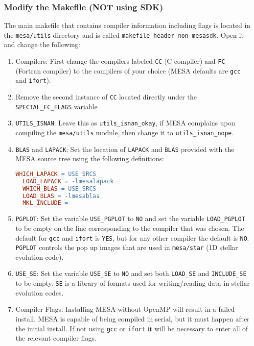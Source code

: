 \subsubsection{Modify the Makefile (NOT using SDK)}
The main makefile that contains compiler information including flags is 
located in the {\tt mesa/utils} directory and is called 
{\tt makefile\_header\_non\_mesasdk}. Open it and change the following:
\begin{enumerate}
\item Compilers: First change the compilers labeled {\tt CC} (C compiler) 
and {\tt FC} (Fortran compiler) to the compilers of your choice ({\sf MESA} 
defaults are {\tt gcc} and {\tt ifort}).

\item Remove the second instance of {\tt CC} located directly under the 
{\tt SPECIAL\_FC\_FLAGS} variable

\item {\tt UTILS\_ISNAN}: Leave this as {\tt utils\_isnan\_okay}, if {\sf MESA} 
complains upon compiling the {\tt mesa/utils} module, then change it to 
{\tt utils\_isnan\_nope}.

\item {\tt BLAS} and {\tt LAPACK}: Set the location of {\tt LAPACK} and 
{\tt BLAS} provided with the {\sf MESA} source tree using the following 
definitions:
\begin{lstlisting}[language=make,mathescape=false,upquote=true]
  WHICH_LAPACK = USE_SRCS
  LOAD_LAPACK = -lmesalapack
  WHICH_BLAS = USE_SRCS
  LOAD_BLAS = -lmesablas
  MKL_INCLUDE =
\end{lstlisting}

\item {\tt PGPLOT}: Set the variable {\tt USE\_PGPLOT} to {\tt NO} and set 
the variable {\tt LOAD\_PGPLOT} to be empty on the line corresponding to 
the compiler that was chosen. The default for {\tt gcc} and {\tt ifort} is 
{\tt YES}, but for any other compiler the default is {\tt NO}. {\tt PGPLOT} 
controls the pop up images that are used in {\tt mesa/star} (1D stellar 
evolution code). 

\item {\tt USE\_SE}: Set the variable {\tt USE\_SE} to {\tt NO} and set both 
{\tt LOAD\_SE} and {\tt INCLUDE\_SE} to be empty. {\tt SE} is a library of 
formats used for writing/reading data in stellar evolution codes.

\item Compiler Flags: Installing {\sf MESA} without OpenMP will result in a 
failed install. {\sf MESA} is capable of being compiled in serial, but it 
must happen after the initial install. If not using {\tt gcc} or {\tt ifort} 
it will be necessary to enter all of the relevant compiler flags.
\end{enumerate}

